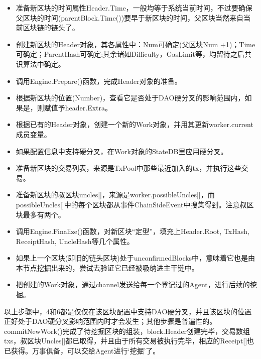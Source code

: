 \documentclass[UTF8]{ctexart}
\begin{document}
\begin{itemize}

\item 准备新区块的时间属性Header.Time，一般均等于系统当前时间，不过要确保父区块的时间(parentBlock.Time())要早于新区块的时间，父区块当然来自当前区块链的链头了。

\item 创建新区块的Header对象，其各属性中：Num可确定(父区块Num +1)；Time可确定；ParentHash可确定;其余诸如Difficulty，GasLimit等，均留待之后共识算法中确定。

\item 调用Engine.Prepare()函数，完成Header对象的准备。

\item 根据新区块的位置(Number)，查看它是否处于DAO硬分叉的影响范围内，如果是，则赋值予header.Extra。

\item 根据已有的Header对象，创建一个新的Work对象，并用其更新worker.current成员变量。

\item 如果配置信息中支持硬分叉，在Work对象的StateDB里应用硬分叉。

\item 准备新区块的交易列表，来源是TxPool中那些最近加入的tx，并执行这些交易。

\item 准备新区块的叔区块uncles[]，来源是worker.possibleUncles[]，而possibleUncles[]中的每个区块都从事件ChainSideEvent中搜集得到。注意叔区块最多有两个。

\item 调用Engine.Finalize()函数，对新区块“定型”，填充上Header.Root, TxHash, ReceiptHash, UncleHash等几个属性。

\item 如果上一个区块(即旧的链头区块)处于unconfirmedBlocks中，意味着它也是由本节点挖掘出来的，尝试去验证它已经被吸纳进主干链中。

\item 把创建的Work对象，通过channel发送给每一个登记过的Agent，进行后续的挖掘。

\end{itemize}

以上步骤中，4和6都是仅仅在该区块配置中支持DAO硬分叉，并且该区块的位置正好处于DAO硬分叉影响范围内时才会发生；其他步骤是普遍性的。commitNewWork()完成了待挖掘区块的组装，block.Header创建完毕，交易数组txs，叔区块Uncles[]都已取得，并且由于所有交易被执行完毕，相应的Receipt[]也已获得。万事俱备，可以交给Agent进行‘挖掘’了。
\end{document}
